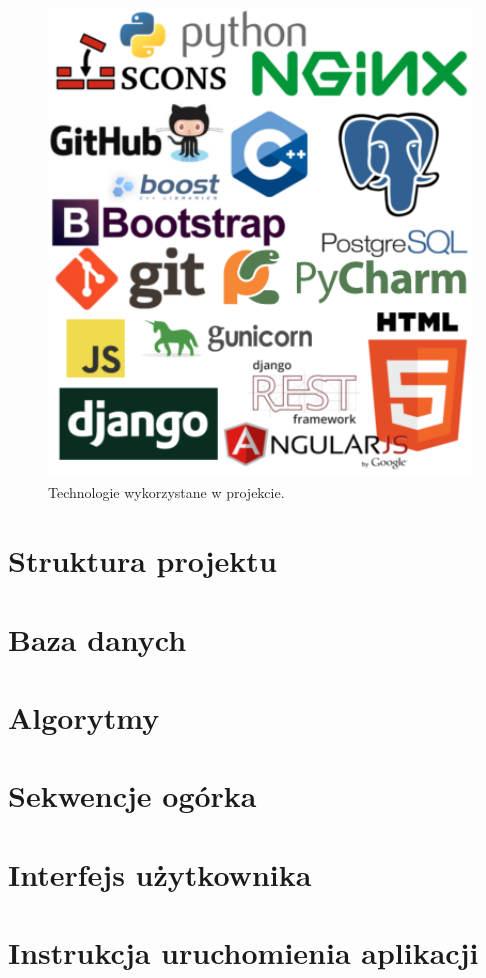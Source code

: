 \begin{figure}[h]
	\centering
	\includegraphics[width=1\textwidth]{img/loga.png}
	\caption{Technologie wykorzystane w projekcie.}
	\vspace{-0.5cm}
	\label{img:technologie}
\end{figure}

\section{Struktura projektu}

\section{Baza danych}

\section{Algorytmy}

\section{Sekwencje ogórka}

\section{Interfejs użytkownika}

\section{Instrukcja uruchomienia aplikacji}

